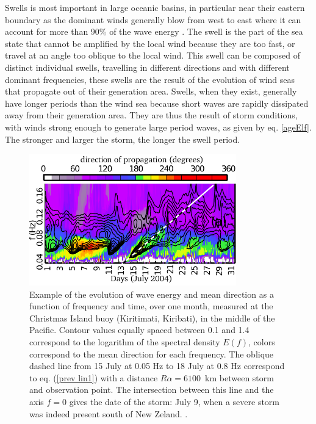 Swells is most important in large oceanic basins, in particular near their eastern boundary as the dominant winds generally blow from west to east where it can account for 
more than 90\% of the wave energy \citep[e.g.][]{Chen&al.2002}. The swell is the part of the sea state that cannot be amplified 
by the local wind because they are too fast, or travel at an angle too oblique to the local wind. 
This swell can be composed of distinct individual swells, travelling in different directions and 
with different dominant frequencies, these swells are the result of the evolution of 
wind seas that propagate out of their generation area. 
Swells, when they exist, generally have longer periods than the wind sea because short waves are rapidly dissipated away from their generation area. They are thus the result of storm conditions, with winds strong enough to generate large period waves, as given by eq. \ref{ageElf}. The stronger and larger the storm, the longer the swell period. 
\begin{figure}[htb]
\centerline{\includegraphics[width=0.8\textwidth]{FIGS_CH_FETCH/SWAO_nature_figS1_en.pdf}}
 \caption{Example of the evolution of wave energy and mean direction as a function of frequency
and time, over one month, measured at the Christmas Island buoy (Kiritimati, Kiribati), 
in the middle of the Pacific. Contour values equally spaced between 
0.1 and 1.4 correspond to the logarithm of the spectral density $E(f)$, colors 
correspond to the mean direction for each frequency. The oblique dashed line 
from 15 July at 0.05 Hz to 18 July at 0.8 Hz correspond to eq. (\ref{prev lin1}) 
with a distance $R \alpha= 6100$~km between storm and observation point. 
The intersection between this line and the axis $f=0$ gives the date of the storm: July 9, 
when a severe storm was indeed present south of New Zeland. \citep[taken from][]{Collard&al.2009}.\label{ridges}}
\end{figure}

